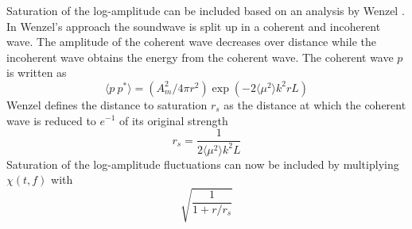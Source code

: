 Saturation of the log-amplitude can be included based on an analysis by Wenzel \cite{Wenzel1975}.
In Wenzel's approach the soundwave is split up in a coherent and incoherent wave. The amplitude of the coherent wave decreases over distance while the incoherent wave obtains the energy from the coherent wave.
The coherent wave $p$ is written as
\begin{equation}
 \langle p \  p^* \rangle = \left( A_m^2 / 4 \pi r^2 \right) \exp{\left( -2 \langle \mu^2 \rangle k^2 r L \right)}
\end{equation}
Wenzel defines the distance to saturation $r_s$ as the distance at which the coherent wave is reduced to $e^{-1}$ of its original strength
\begin{equation}\label{eq:saturation_distance}
 r_s = \frac{1}{2 \langle \mu^2 \rangle k^2 L}
\end{equation}
Saturation of the log-amplitude fluctuations can now be included by multiplying $\chi(t,f)$ with
\begin{equation}
 \sqrt{ \frac{ 1}{1 + r/r_s}}
\end{equation}


%

